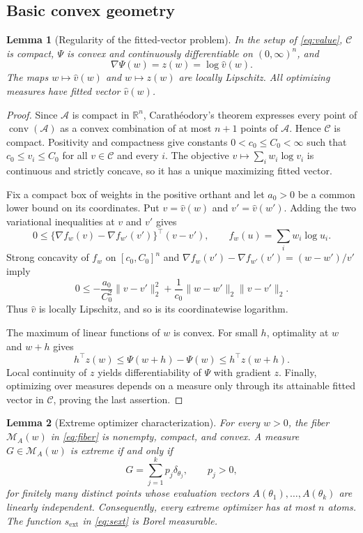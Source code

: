 \documentclass[11pt]{article}
\newtheorem{lemma}[lemma]{Lemma}
\theoremstyle{definition}
\theoremstyle{remark}
\DeclareMathOperator{\conv}{conv}
\newcommand{\Mcal}{\mathcal M}
\newcommand{\Ccal}{\mathcal C}
\newcommand{\Acal}{\mathcal A}
\newcommand{\RR}{\mathbb R}
\newcommand{\norm}[1]{\lVert #1\rVert}
\newcommand{\vhat}{\widehat v}
\begin{document}
\subsection{Basic convex geometry}

\begin{lemma}[Regularity of the fitted-vector problem]
\label{lem:regularity}
In the setup of \eqref{eq:value}, $\Ccal$ is compact,
$\Psi$ is convex and continuously differentiable on $(0,\infty)^n$, and
\[
 \nabla\Psi(w)=z(w)=\log\vhat(w).
\]
The maps $w\mapsto\vhat(w)$ and $w\mapsto z(w)$ are locally Lipschitz.
All optimizing measures have fitted vector $\vhat(w)$.
\end{lemma}

\begin{proof}
Since $\Acal$ is compact in $\RR^n$, Carath\'eodory's theorem expresses
every point of $\conv(\Acal)$ as a convex combination of at most $n+1$
points of $\Acal$.  Hence $\Ccal$ is compact.  Positivity and compactness give
constants $0<c_0\le C_0<\infty$ such that
$c_0\le v_i\le C_0$ for all $v\in\Ccal$ and every $i$.  The objective
$v\mapsto\sum_iw_i\log v_i$ is continuous and strictly concave, so it has a
unique maximizing fitted vector.

Fix a compact box of weights in the positive orthant and let $a_0>0$ be a
common lower bound on its coordinates.  Put
$v=\vhat(w)$ and $v'=\vhat(w')$.  Adding the two variational inequalities at
$v$ and $v'$ gives
\[
 0\le\{\nabla f_w(v)-\nabla f_{w'}(v')\}^\top(v-v'),
 \qquad f_w(u)=\sum_iw_i\log u_i.
\]
Strong concavity of $f_w$ on $[c_0,C_0]^n$ and
$\nabla f_w(v')-\nabla f_{w'}(v')=(w-w')/v'$ imply
\[
 0\le-\frac{a_0}{C_0^2}\norm{v-v'}_2^2
       +\frac1{c_0}\norm{w-w'}_2\norm{v-v'}_2.
\]
Thus $\vhat$ is locally Lipschitz, and so is its coordinatewise logarithm.

The maximum of linear functions of $w$ is convex.  For small $h$, optimality
at $w$ and $w+h$ gives
\[
 h^\top z(w)\le\Psi(w+h)-\Psi(w)\le h^\top z(w+h).
\]
Local continuity of $z$ yields differentiability of $\Psi$ with gradient
$z$.  Finally, optimizing over measures depends on a measure only through its
attainable fitted vector in $\Ccal$, proving the last assertion.
\end{proof}

\begin{lemma}[Extreme optimizer characterization]
\label{lem:extreme}
For every $w>0$, the fiber $\Mcal_A(w)$ in \eqref{eq:fiber} is nonempty,
compact, and convex.  A measure $G\in\Mcal_A(w)$ is extreme if and only if
\[
 G=\sum_{j=1}^kp_j\delta_{\theta_j},\qquad p_j>0,
\]
for finitely many distinct points whose evaluation vectors
$A(\theta_1),\ldots,A(\theta_k)$ are linearly independent.  Consequently,
every extreme optimizer has at most $n$ atoms.  The function
$s_{\mathrm{ext}}$ in \eqref{eq:sext} is Borel measurable.
\end{lemma}
\end{document}
